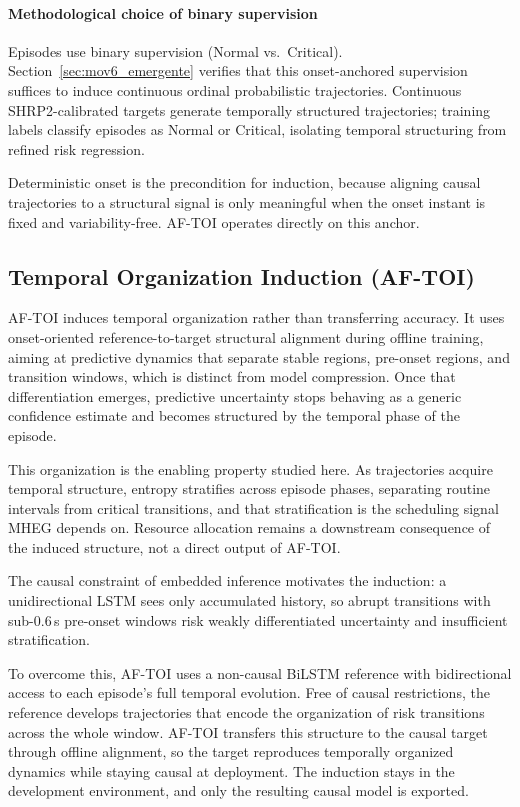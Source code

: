 \documentclass[a4paper,fleqn]{cas-dc}
\newcommand{\AFTOI}{\mbox{AF-TOI}\xspace}
\newcommand{\MHEG}{\mbox{MHEG}\xspace}
\begin{document}
\paragraph{Methodological choice of binary supervision}
Episodes use binary supervision (Normal vs.\ Critical). Section~\ref{sec:mov6_emergente}
verifies that this onset-anchored supervision suffices to induce continuous
ordinal probabilistic trajectories. Continuous SHRP2-calibrated targets generate
temporally structured trajectories; training labels classify episodes as Normal
or Critical, isolating temporal structuring from refined risk regression.

Deterministic onset is the precondition for induction, because aligning causal trajectories to a structural signal is only meaningful when the onset instant is fixed and variability-free. \AFTOI operates directly on this anchor.
\subsection{Temporal Organization Induction (\mbox{AF-TOI})}
\label{sec:aftoi}
\AFTOI induces temporal organization rather than transferring accuracy. It uses
onset-oriented reference-to-target structural alignment during offline training,
aiming at predictive dynamics that separate stable regions, pre-onset regions,
and transition windows, which is distinct from model compression. Once that
differentiation emerges, predictive uncertainty stops behaving as a generic
confidence estimate and becomes structured by the temporal phase of the episode.

This organization is the enabling property studied here. As trajectories acquire
temporal structure, entropy stratifies across episode phases, separating routine
intervals from critical transitions, and that stratification is the scheduling
signal \MHEG depends on. Resource allocation remains a downstream consequence of
the induced structure, not a direct output of \AFTOI.

The causal constraint of embedded inference motivates the induction: a
unidirectional LSTM sees only accumulated history, so abrupt transitions with
sub-0.6\,s pre-onset windows risk weakly differentiated uncertainty and
insufficient stratification.

To overcome this, \AFTOI uses a non-causal BiLSTM reference with bidirectional
access to each episode's full temporal evolution. Free of causal restrictions,
the reference develops trajectories that encode the organization of risk
transitions across the whole window. \AFTOI transfers this structure to the
causal target through offline alignment, so the target reproduces temporally
organized dynamics while staying causal at deployment. The induction stays in
the development environment, and only the resulting causal model is exported.
\end{document}
